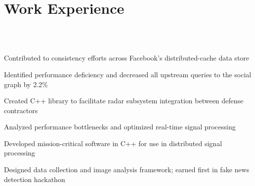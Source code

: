 \documentclass[]{resume-style}
\begin{document}
\vspace{-1mm}

\section{\hfill Work Experience \hfill}

 \\
\vspace{0.5mm}
\vspace{2mm}
\vspace{0.25mm}
\vspace{2mm} \\
\begin{tightemize}
\vspace{-1.0mm}
\item Contributed to consistency efforts across Facebook's distributed-cache data store
\item Identified performance deficiency and decreased all upstream queries to the social graph by 2.2\%
\end{tightemize}

\vspace{2mm}
\vspace{-1.35mm}
\begin{tightemize}
\vspace{\topsep} %
\item Created C++ library to facilitate radar subsystem integration between defense contractors
\item Analyzed performance bottlenecks and optimized real-time signal processing
\item Developed mission-critical software in C++ for use in distributed signal processing
\item Designed data collection and image analysis framework; earned first in fake news detection hackathon
\end{tightemize}
\end{document}
